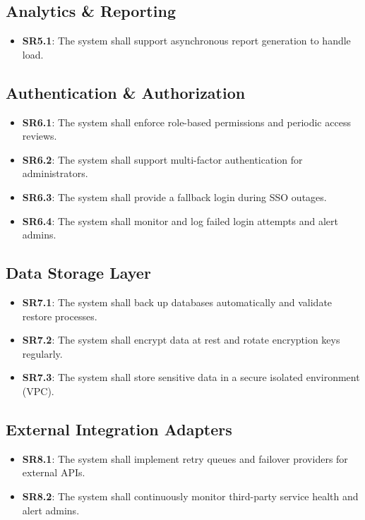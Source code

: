 \documentclass{article}
\begin{document}
\subsection{Analytics \& Reporting}
\begin{itemize}
    \item \textbf{SR5.1}: The system shall support asynchronous report generation to handle load.
\end{itemize}

\subsection{Authentication \& Authorization}
\begin{itemize}
    \item \textbf{SR6.1}: The system shall enforce role-based permissions and periodic access reviews.
    \item \textbf{SR6.2}: The system shall support multi-factor authentication for administrators.
    \item \textbf{SR6.3}: The system shall provide a fallback login during SSO outages.
    \item \textbf{SR6.4}: The system shall monitor and log failed login attempts and alert admins.
\end{itemize}

\subsection{Data Storage Layer}
\begin{itemize}
    \item \textbf{SR7.1}: The system shall back up databases automatically and validate restore processes.
    \item \textbf{SR7.2}: The system shall encrypt data at rest and rotate encryption keys regularly.
    \item \textbf{SR7.3}: The system shall store sensitive data in a secure isolated environment (VPC).
\end{itemize}

\subsection{External Integration Adapters}
\begin{itemize}
    \item \textbf{SR8.1}: The system shall implement retry queues and failover providers for external APIs.
    \item \textbf{SR8.2}: The system shall continuously monitor third-party service health and alert admins.
\end{itemize}
\end{document}
